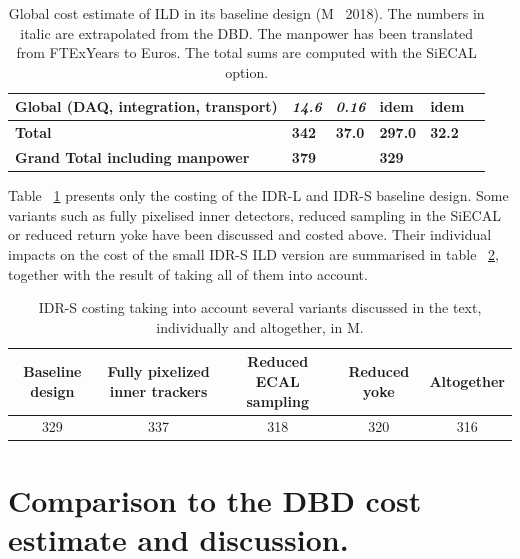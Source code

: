 \begin{table}[h!]
\begin{tabular}{ l p{0.15\hsize}p{0.12\hsize}p{0.12\hsize} p{0.12\hsize}p{0.12\hsize}}
\bf{Global (DAQ, integration, transport)}  &\bf{\it14.6} &\bf{\it0.16}& \bf{idem}& \bf{idem}\\
\midrule
\bf{Total} & \bf{342}   &  \bf{37.0}  & \bf{297.0} & \bf{32.2}  \\
\midrule
\bf{Grand Total including manpower}    & \bf{379}   &    & \bf{329} &   \\
 \bottomrule
\end{tabular}
\caption{\label{cost_summary}Global cost estimate of ILD in its baseline design (M\texteuro~ 2018). The numbers in italic are extrapolated from the DBD. The manpower has been translated from FTExYears to Euros. The total sums are computed with the SiECAL option.
}
\end{table}
Table ~\ref{cost_summary} presents only the costing of the IDR-L and IDR-S baseline design. Some variants such as fully pixelised inner detectors, reduced sampling in the SiECAL or reduced return yoke have been discussed and costed above. Their individual impacts on the cost of the small IDR-S ILD version are summarised in table ~\ref{cost_variants}, together with the result of taking all of them into account.
\begin{table}[h!]\hspace*{-0cm}\small
\begin{tabular}{ccccc}
\toprule
\bf {Baseline design} & \bf Fully pixelized inner trackers &  \bf Reduced ECAL sampling&\bf Reduced yoke&\bf Altogether\\
\midrule
329&337&318&320&316\\
\bottomrule
\end{tabular}
\caption{\label{cost_variants}IDR-S costing taking into account several variants discussed in the text, individually and altogether, in M\texteuro.}
\end{table}

\section{Comparison to the DBD cost estimate and discussion.}
 
